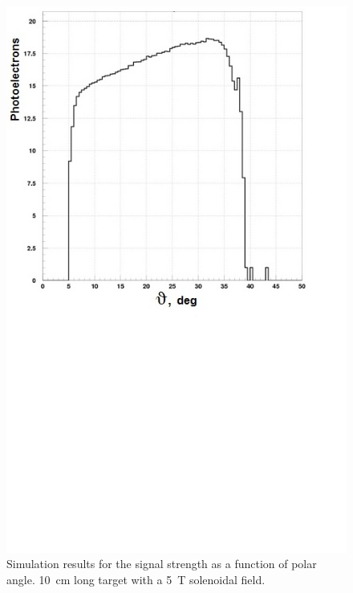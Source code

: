 \begin{figure}[!ht]
    \centering
    \includegraphics[width=1.0\linewidth,trim={0.0cm 9.4cm 0.0cm 0.0cm},clip]{images/10cm_Targ_5T_Field_Theta.jpg}
    \caption{Simulation results for the signal strength as a function of polar angle. 10~cm long target with a 5~T
      solenoidal field.}
    \label{fig:10cm_Targ_5T_Field_Theta}
\end{figure}

%
%

